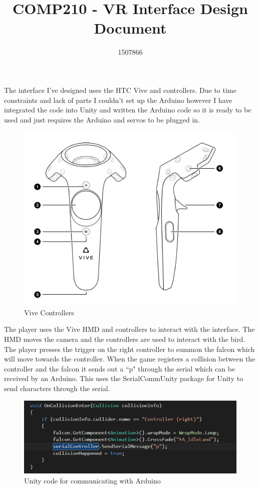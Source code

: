 \documentclass{scrartcl}
\title{COMP210 - VR Interface Design Document}
\author{1507866}
\begin{document}
	
\maketitle
The interface I've designed uses the HTC Vive and controllers. Due to time constraints and lack of parts I couldn't set up the Arduino however I have integrated the code into Unity and written the Arduino code so it is ready to be used and just requires the Arduino and servos to be plugged in. 

\begin{figure}[h]
	\includegraphics[width=0.8\linewidth]{vive_controller.png}
	\caption{Vive Controllers  }
\end{figure} 

The player uses the Vive HMD and controllers to interact with the interface. The HMD moves the camera and the controllers are used to interact with the bird.  The player presses the trigger on the right controller to summon the falcon which will move towards the controller. When the game registers a collision between the controller and the falcon it sends out a ``p" through the serial which can be received by an Arduino. This uses the SerialCommUnity package for Unity to send characters through the serial.

\begin{figure}[h]
	\includegraphics[width=1.0\linewidth]{unity_code.png}
	\caption{ Unity code for communicating with Arduino }
\end{figure} 
\end{document}
